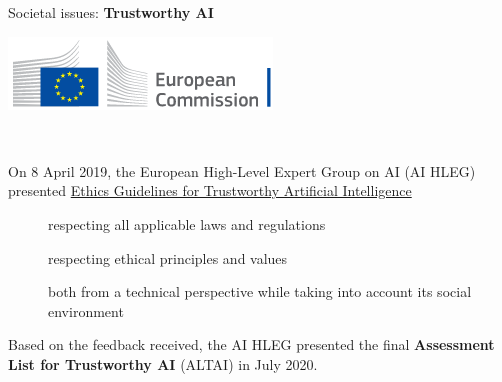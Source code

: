 \documentclass[10pt,serif,mathserif,compress,hyperref={colorlinks}]{beamer}
\begin{document}
\begin{frame}{Societal issues: {\bf Trustworthy AI}}

  \hspace*{-2mm}\begin{minipage}{.35\textwidth}
    \includegraphics[width=\linewidth]{images/logo-ec--en.png}
  \end{minipage}\ \begin{minipage}{.65\textwidth}
  \small
  On 8 April 2019, the European High-Level Expert Group on AI (AI HLEG)%
  \footnotemark presented   \href{https://digital-strategy.ec.europa.eu/en/library/ethics-guidelines-trustworthy-ai}
       {Ethics Guidelines for Trustworthy Artificial Intelligence}

  \end{minipage}
\bigskip      
  \begin{tcolorbox}[title={According to the Guidelines, trustworthy AI should be:}]   
    
    \begin{description}
    \item[]  respecting all applicable laws and regulations
    \item[] respecting ethical principles and values
    \item[] both from a technical perspective while taking into account its social environment       
    \end{description}
  \end{tcolorbox}
  \vfill
  Based on the feedback received, the AI HLEG  presented the final {\bf Assessment List for Trustworthy AI} (ALTAI) in July 2020.
       
\end{frame}
\end{document}
